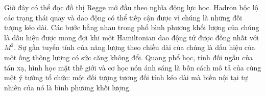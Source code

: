 \begin{classroomqa}
\end{classroomqa}

Giờ đây có thể đọc đồ thị Regge mở đầu theo nghĩa động lực học. Hadron bộc lộ các trạng thái quay và dao động có thể tiếp cận được vì chúng là những đối tượng kéo dài. Các bước bằng nhau trong phổ bình phương khối lượng của chúng là dấu hiệu được mong đợi khi một Hamiltonian dao động tử được đồng nhất với \(M^2\). Sự gần tuyến tính của năng lượng theo chiều dài của chúng là dấu hiệu của một ống thông lượng có sức căng không đổi. Quang phổ học, tính đối ngẫu của tán xạ, hình học mặt thế giới và cơ học nón ánh sáng là bốn cách mô tả của cùng một ý tưởng tổ chức: một đối tượng tương đối tính kéo dài mà biến nội tại tự nhiên của nó là bình phương khối lượng.
